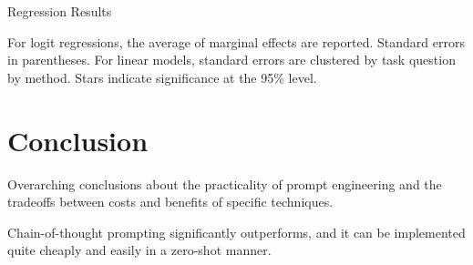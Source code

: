 \documentclass[11pt]{article}
\begin{document}

\begin{table}
  \caption{Regression Results}
  \centering
  \tiny
    
  \label{tab:regressions}
  \newline \newline \footnotesize For logit regressions, the average of marginal effects are reported. Standard errors in parentheses. For linear models, standard errors are clustered by task question by method. Stars indicate significance at the 95\% level.
\end{table}

%     

%     


\section*{Conclusion}

Overarching conclusions about the practicality of prompt engineering and the tradeoffs between costs and benefits of specific techniques.

Chain-of-thought prompting significantly outperforms, and it can be implemented quite cheaply and easily in a zero-shot manner.
\end{document}
